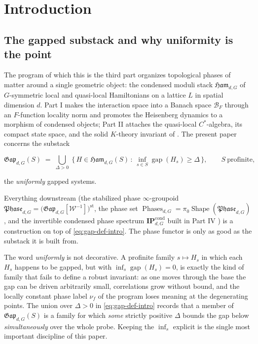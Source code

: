 \documentclass[12pt]{article}
\newcommand{\Shape}{\operatorname{Shape}}      %
\newcommand{\Ffun}{F}                          %
\newcommand{\BF}{\mathcal{B}_{F}}              %
\newcommand{\Ham}{\mathfrak{Ham}}              %
\newcommand{\Gap}{\mathfrak{Gap}}              %
\newcommand{\Phase}{\mathfrak{Phase}}          %
\newcommand{\Phases}{\operatorname{Phases}}    %
\newcommand{\Weq}{\mathcal{W}}                 %
\newcommand{\st}{\mathrm{st}}                  %
\newcommand{\gapof}[1]{\operatorname{gap}(#1)} %
\newcommand{\gapbound}{\Delta}                  %
\newcommand{\IPcond}{\mathbf{IP}^{\mathrm{cond}}}  %
\newcommand{\set}[1]{\{\,#1\,\}}
\DeclareMathOperator*{\einf}{inf}
\theoremstyle{plain}
\theoremstyle{definition}
\theoremstyle{remark}
\begin{document}
\tableofcontents

\section{Introduction}
\label{sec:intro}

\subsection{The gapped substack and why uniformity is the point}

The program of which this is the third part organizes topological phases of matter
around a single geometric object: the condensed moduli stack $\Ham_{d,G}$ of
$G$-symmetric local and quasi-local Hamiltonians on a lattice $L$ in spatial
dimension $d$. Part I \cite{paperLocality} makes the interaction space into a Banach
space $\BF$ through an $\Ffun$-function locality norm and promotes the Heisenberg
dynamics to a morphism of condensed objects; Part II \cite{paperPositivity} attaches
the quasi-local $C^*$-algebra, its compact state space, and the solid $K$-theory
invariant of \cite{aoki-solidification}. The present paper concerns the substack

\begin{equation}
\label{eq:gap-def-intro}
\Gap_{d,G}(S)\;=\;\bigcup_{\gapbound>0}\;
\set{H\in\Ham_{d,G}(S)\,:\,\einf_{s\in S}\gapof{H_s}\ge\gapbound},
\qquad S\ \text{profinite},
\end{equation}

the \emph{uniformly} gapped systems.\par\noindent
Everything downstream (the stabilized phase
$\infty$-groupoid $\Phase_{d,G}=\big(\Gap_{d,G}[\Weq^{-1}]\big)^{\st}$, the phase
set $\Phases_{d,G}=\pi_0\Shape(\Phase_{d,G})$, and the invertible condensed phase
spectrum $\IPcond_{d,G}$ built in Part IV \cite{paperEFT}) is a construction on top
of \eqref{eq:gap-def-intro}. The phase functor is only as good as the substack it is
built from.

The word \emph{uniformly} is not decorative. A profinite family $s\mapsto H_s$ in
which each $H_s$ happens to be gapped, but with $\einf_{s}\gapof{H_s}=0$, is exactly
the kind of family that fails to define a robust invariant: as one moves through the
base the gap can be driven arbitrarily small, correlations grow without bound, and
the locally constant phase label $\nu_f$ of the program loses meaning at the
degenerating points. The union over $\gapbound>0$ in \eqref{eq:gap-def-intro} records
that a member of $\Gap_{d,G}(S)$ is a family for which \emph{some} strictly positive
$\gapbound$ bounds the gap below \emph{simultaneously} over the whole probe. Keeping
the $\einf_{s}$ explicit is the single most important discipline of this paper.
\end{document}
